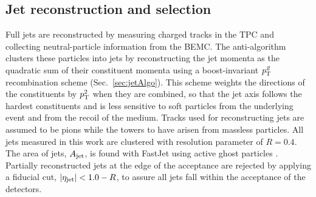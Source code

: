 \subsection{Jet reconstruction and selection} \label{sec:JetRecoAuAu}
Full jets are reconstructed by measuring charged tracks in the TPC and collecting neutral-particle information from the BEMC.  The anti-\kt algorithm 
clusters these particles into jets by reconstructing the jet momenta as the quadratic sum of their constituent momenta using a boost-invariant $\it{p}^{2}_{\rm T}$ recombination scheme (Sec.~\ref{sec:jetAlgo}).  This scheme weights the directions of the constituents by $p^{2}_{\rm T}$ when they are combined, so that the jet axis follows the hardest constituents and is less sensitive to soft particles from the underlying event and from the recoil of the medium.  Tracks used for reconstructing jets are assumed to be pions while the towers to have arisen from massless particles. All jets measured in this work are clustered with resolution parameter of $R=0.4$. The area of jets, $A_{\rm jet}$, is found with FastJet using active ghost particles \cite{Cacciari:2008gn}.  Partially reconstructed jets at the edge of the acceptance are rejected by applying a fiducial cut, $|\eta_{\rm jet}| < 1.0 - R$, to assure all jets fall within the acceptance of the detectors. 


